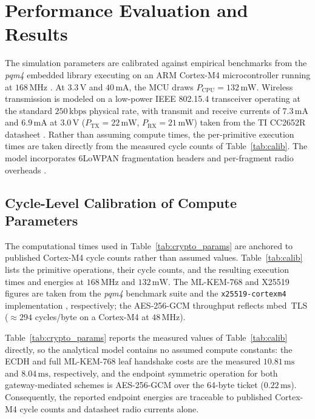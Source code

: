 \documentclass[journal]{IEEEtran}
\begin{document}

\section{Performance Evaluation and Results}
\label{sec:evaluation}

The simulation parameters are calibrated against empirical benchmarks from the \textit{pqm4}
embedded library executing on an ARM Cortex-M4 microcontroller running at $168\,\text{MHz}$
\cite{kannwischer2020pqm4}. At $3.3\,\text{V}$ and $40\,\text{mA}$, the MCU draws
$P_{\mathrm{CPU}} = 132\,\text{mW}$. Wireless transmission is modeled on a low-power IEEE 802.15.4
transceiver operating at the standard $250\,\text{kbps}$ physical rate, with transmit and receive
currents of $7.3\,\text{mA}$ and $6.9\,\text{mA}$ at $3.0\,\text{V}$ ($P_{\mathrm{TX}} = 22\,\text{mW}$,
$P_{\mathrm{RX}} = 21\,\text{mW}$) taken from the TI CC2652R datasheet \cite{ti2023cc2652r}.
Rather than assuming compute times, the per-primitive execution times are taken directly from the
measured cycle counts of Table~\ref{tab:calib}. The model incorporates 6LoWPAN fragmentation
headers and per-fragment radio overheads \cite{montenegro2007transmission}.

\subsection{Cycle-Level Calibration of Compute Parameters}
\label{sec:calibration}

The computational times used in Table~\ref{tab:crypto_params} are anchored to
published Cortex-M4 cycle counts rather than assumed values. Table~\ref{tab:calib}
lists the primitive operations, their cycle counts, and the resulting execution
times and energies at $168\,\text{MHz}$ and $132\,\text{mW}$. The ML-KEM-768 and
X25519 figures are taken from the \textit{pqm4} benchmark suite
\cite{kannwischer2020pqm4} and the \texttt{x25519-cortexm4} implementation
\cite{degroot2019x25519}, respectively; the AES-256-GCM throughput reflects mbed~TLS
($\approx 294$ cycles/byte on a Cortex-M4 at $48\,\text{MHz}$).

Table~\ref{tab:crypto_params} reports the measured values of Table~\ref{tab:calib}
directly, so the analytical model contains no assumed compute constants: the ECDH and
full ML-KEM-768 leaf handshake costs are the measured $10.81\,\text{ms}$ and
$8.04\,\text{ms}$, respectively, and the endpoint symmetric operation for both
gateway-mediated schemes is AES-256-GCM over the 64-byte ticket ($0.22\,\text{ms}$).
Consequently, the reported endpoint energies are traceable to published Cortex-M4 cycle
counts and datasheet radio currents alone.
\end{document}
